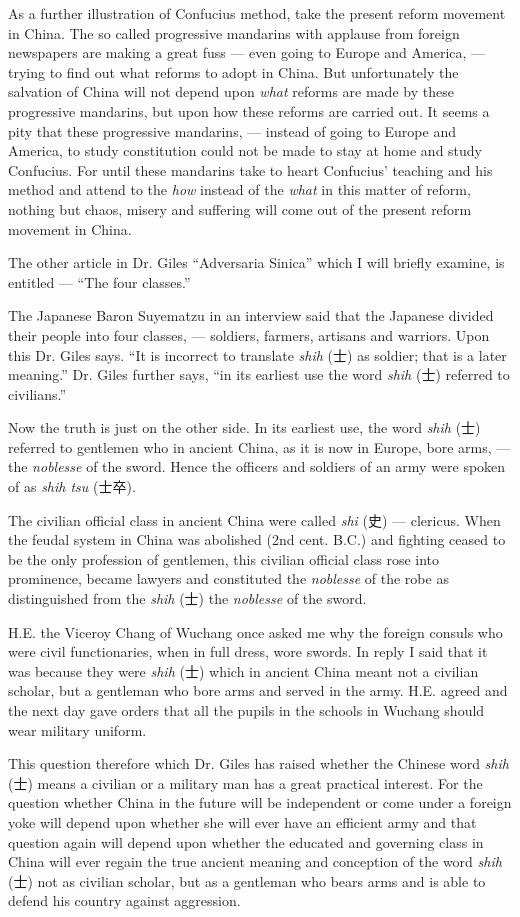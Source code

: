 As a further illustration of Confucius method, take the present reform movement in China.
The so called progressive mandarins with applause from foreign newspapers are making a great fuss --- even going to Europe and America, --- trying to find out what reforms to adopt in China.
But unfortunately the salvation of China will not depend upon \emph{what} reforms are made by these progressive mandarins, but upon how these reforms are carried out.
It seems a pity that these progressive mandarins, --- instead of going to Europe and America, to study constitution could not be made to stay at home and study Confucius.
For until these mandarins take to heart Confucius' teaching and his method and attend to the \emph{how} instead of the \emph{what} in this matter of reform, nothing but chaos, misery and suffering will come out of the present reform movement in China.

The other article in Dr. Giles ``Adversaria Sinica'' which I will briefly examine, is entitled --- ``The four classes.''

The Japanese Baron Suyematzu in an interview said that the Japanese divided their people into four classes, --- soldiers, farmers, artisans and warriors.
Upon this Dr. Giles says. ``It is incorrect to translate \emph{shih} (士) as soldier; that is a later meaning.''
Dr. Giles further says, ``in its earliest use the word \emph{shih} (士) referred to civilians.''

Now the truth is just on the other side.
In its earliest use, the word \emph{shih} (士) referred to gentlemen who in ancient China, as it is now in Europe, bore arms, --- the \emph{noblesse} of the sword.
Hence the officers and soldiers of an army were spoken of as \emph{shih tsu} (士卒).

The civilian official class in ancient China were called \emph{shi} (史) --- clericus.
When the feudal system in China was abolished (2nd cent. B.C.) and fighting ceased to be the only profession of gentlemen, this civilian official class rose into prominence, became lawyers and constituted the \emph{noblesse} of the robe as distinguished from the \emph{shih} (士) the \emph{noblesse} of the sword.

H.E. the Viceroy Chang of Wuchang once asked me why the foreign consuls who were civil functionaries, when in full dress, wore swords.
In reply I said that it was because they were \emph{shih} (士) which in ancient China meant not a civilian scholar, but a gentleman who bore arms and served in the army.
H.E. agreed and the next day gave orders that all the pupils in the schools in Wuchang should wear military uniform.

This question therefore which Dr. Giles has raised whether the Chinese word \emph{shih} (士) means a civilian or a military man has a great practical interest.
For the question whether China in the future will be independent or come under a foreign yoke will depend upon whether she will ever have an efficient army and that question again will depend upon whether the educated and governing class in China will ever regain the true ancient meaning and conception of the word \emph{shih} (士) not as civilian scholar, but as a gentleman who bears arms and is able to defend his country against aggression. 


